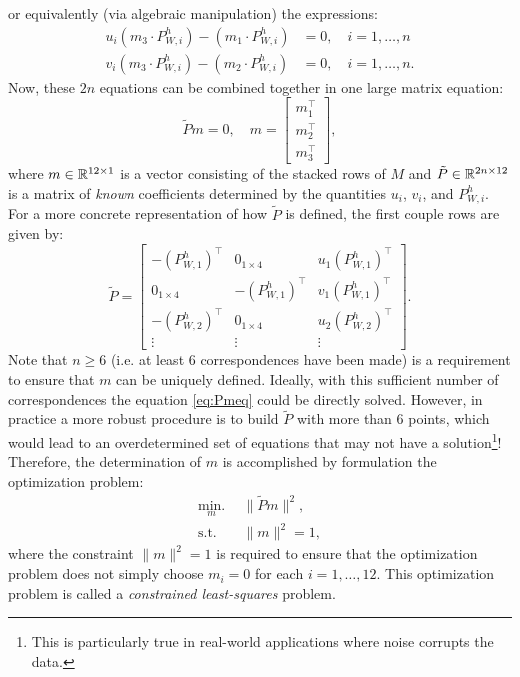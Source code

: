 or equivalently (via algebraic manipulation) the expressions:
\begin{equation}
\begin{split}
    u_i(m_3 \cdot P_{W,i}^h) - (m_1 \cdot P_{W,i}^h) &= 0, \quad i = 1,\dots,n \\
    v_i(m_3 \cdot P_{W,i}^h) - (m_2 \cdot P_{W,i}^h) &= 0, \quad i = 1,\dots,n.
\end{split}
\end{equation}
Now, these $2n$ equations can be combined together in one large matrix equation:
\begin{equation}
    \tilde{P}m = 0, \quad m = \begin{bmatrix}
        m_1^\top  \\ m_2^\top  \\ m_3^\top 
    \end{bmatrix},
\end{equation}
where $m \in \mathbb{R}^{12 \times 1}$ is a vector consisting of the stacked rows of $M$ and $\tilde{P} \in \mathbb{R}^{2n \times 12}$ is a matrix of \textit{known} coefficients determined by the quantities $u_i$, $v_i$, and $P^h_{W,i}$. For a more concrete representation of how $\tilde{P}$ is defined, the first couple rows are given by:
\begin{equation} \label{eq:Pmeq}
\tilde{P} =
     \begin{bmatrix}
  -(P_{W,1}^h)^\top  & 0_{1\times 4} & u_{1} (P_{W,1}^h)^\top  \\
  0_{1 \times 4} & -(P_{W,1}^h)^\top  & v_{1} (P_{W,1}^h)^\top   \\
  -(P_{W,2}^h)^\top  & 0_{1\times 4} & u_{2} (P_{W,2}^h)^\top  \\
  \vdots & \vdots & \vdots
 \end{bmatrix}.
\end{equation}
Note that $n \geq 6$ (i.e. at least 6 correspondences have been made) is a requirement to ensure that $m$ can be uniquely defined. Ideally, with this sufficient number of correspondences the equation \eqref{eq:Pmeq} could be directly solved. However, in practice a more robust procedure is to build $\tilde{P}$ with more than 6 points, which would lead to an overdetermined set of equations that may not have a solution\footnote{This is particularly true in real-world applications where noise corrupts the data.}! 
Therefore, the determination of $m$ is accomplished by formulation the optimization problem:
\begin{equation} \label{eq:mopt}
\begin{split}
\underset{m}{\text{min.}} \:\:& \lVert \tilde{P} m \rVert^2, \\
    \text{s.t.}\:\:& \lVert m \rVert^2 = 1,
\end{split}
\end{equation}
where the constraint $\lVert m \rVert^2 = 1$ is required to ensure that the optimization problem does not simply choose $m_i=0$ for each $i = 1,\dots,12$. This optimization problem is called a \textit{constrained least-squares} problem.

